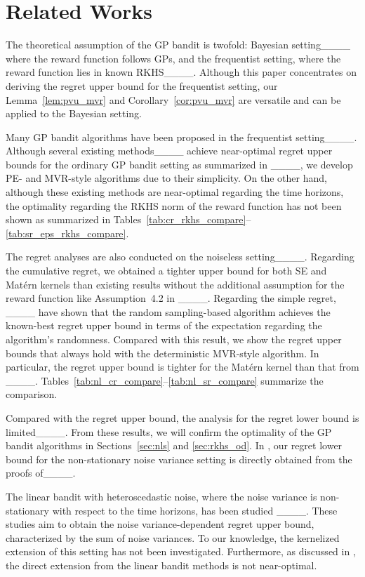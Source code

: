 \section{Related Works}
The theoretical assumption of the GP bandit is twofold: Bayesian setting____ where the reward function follows GPs, and the frequentist setting, where the reward function lies in known RKHS____.
%
Although this paper concentrates on deriving the regret upper bound for the frequentist setting, our Lemma~\ref{lem:pvu_mvr} and Corollary~\ref{cor:pvu_mvr} are versatile and can be applied to the Bayesian setting.


Many GP bandit algorithms have been proposed in the frequentist setting____.
%
Although several existing methods____ achieve near-optimal regret upper bounds for the ordinary GP bandit setting as summarized in ____, we develop PE- and MVR-style algorithms due to their simplicity.
%
On the other hand, although these existing methods are near-optimal regarding the time horizons, the optimality regarding the RKHS norm of the reward function has not been shown as summarized in Tables~\ref{tab:cr_rkhs_compare}--\ref{tab:sr_eps_rkhs_compare}.


The regret analyses are also conducted on the noiseless setting____.
%
Regarding the cumulative regret, we obtained a tighter upper bound for both SE and Mat\'ern kernels than existing results without the additional assumption for the reward function like Assumption~4.2 in ____.
%
Regarding the simple regret, ____ have shown that the random sampling-based algorithm achieves the known-best regret upper bound in terms of the expectation regarding the algorithm's randomness.
% 
Compared with this result, we show the regret upper bounds that always hold with the deterministic MVR-style algorithm.
%
In particular, the regret upper bound is tighter for the Mat\'ern kernel than that from ____.
%
Tables~\ref{tab:nl_cr_compare}--\ref{tab:nl_sr_compare} summarize the comparison.


Compared with the regret upper bound, the analysis for the regret lower bound is limited____.
%
From these results, we will confirm the optimality of the GP bandit algorithms in Sections~\ref{sec:nls} and \ref{sec:rkhs_od}.
%
In , our regret lower bound for the non-stationary noise variance setting is directly obtained from the proofs of____.



The linear bandit with heteroscedastic noise, where the noise variance is non-stationary with respect to the time horizons, has been studied ____.
%
These studies aim to obtain the noise variance-dependent regret upper bound, characterized by the sum of noise variances.
%
To our knowledge, the kernelized extension of this setting has not been investigated.
%
Furthermore, as discussed in , the direct extension from the linear bandit methods is not near-optimal.



